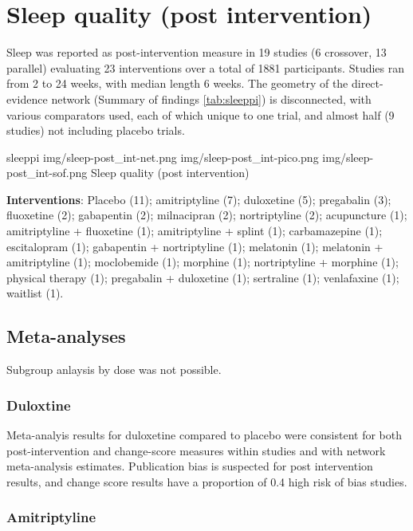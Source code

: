 \documentclass{report}\usepackage[]{graphicx}\usepackage[]{color}
\begin{document}
\section{Sleep quality (post intervention)}


Sleep was reported as post-intervention measure in 19 studies (6 crossover, 13 parallel) evaluating 23 interventions over a total of 1881 participants. Studies ran from 2 to 24 weeks, with median length 6 weeks. The geometry of the direct-evidence network (Summary of findings \ref{tab:sleeppi}) is disconnected, with various comparators used, each of which unique to one trial, and almost half (9 studies) not including placebo trials.

\soffignew
{sleeppi}
{img/sleep-post_int-net.png}
{img/sleep-post_int-pico.png}
{img/sleep-post_int-sof.png}
{Sleep quality (post intervention)}

\textbf{Interventions}: Placebo (11); amitriptyline (7); duloxetine (5); pregabalin (3); fluoxetine (2); gabapentin (2); milnacipran (2); nortriptyline (2); acupuncture (1); amitriptyline + fluoxetine (1); amitriptyline + splint (1); carbamazepine (1); escitalopram (1); gabapentin + nortriptyline (1); melatonin (1); melatonin + amitriptyline (1); moclobemide (1); morphine (1); nortriptyline + morphine (1); physical therapy (1); pregabalin + duloxetine (1); sertraline (1); venlafaxine (1); waitlist (1).

\subsection{Meta-analyses}

Subgroup anlaysis by dose was not possible.

\subsubsection{Duloxtine}

Meta-analyis results for duloxetine compared to placebo were consistent for both post-intervention and change-score measures within studies and with network meta-analysis estimates. Publication bias is suspected for post intervention results, and change score results have a proportion of 0.4 high risk of bias studies.

\subsubsection{Amitriptyline}
\end{document}
